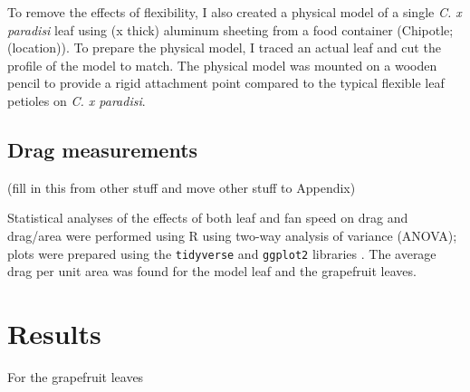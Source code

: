 \documentclass{article}
\begin{document}
To remove the effects of flexibility, I also created a physical model of a single \emph{C. x paradisi} leaf using (x thick) aluminum sheeting from a food container (Chipotle; (location)). To prepare the physical model, I traced an actual leaf and cut the profile of the model to match. The physical model was mounted on a wooden pencil to provide a rigid attachment point compared to the typical flexible leaf petioles on \emph{C. x paradisi}. 

\subsection{Drag measurements}
(fill in this from other stuff and move other stuff to Appendix)


Statistical analyses of the effects of both leaf and fan speed on drag and drag/area were performed using R \citep{r2020} using two-way analysis of variance (ANOVA); plots were prepared using the \lstinline{tidyverse} and \lstinline{ggplot2} libraries \citep{wickham2019tidyverse}. The average drag per unit area was found for the model leaf and the grapefruit leaves.

\section{Results}
For the grapefruit leaves 
\end{document}
